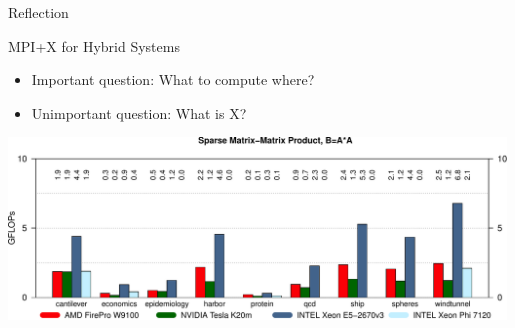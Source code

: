 

\begin{frame}[fragile]{Reflection}

 \begin{block}{MPI+X for Hybrid Systems}
  \begin{itemize}
   \item Important question: What to compute where?
   \item Unimportant question: What is X?
  \end{itemize}
 \end{block}
 
 
 \begin{center}
  \includegraphics[width=0.99\textwidth]{figures/spgemm-crop}
 \end{center}

\end{frame}





